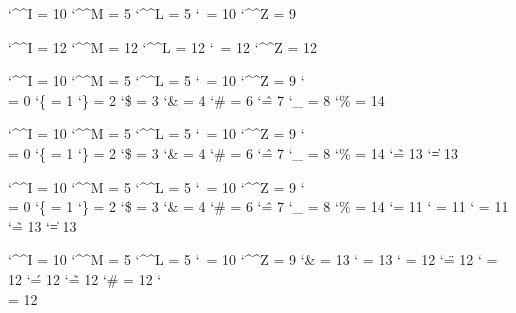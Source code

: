 
\startcatcodetable \nilcatcodes
    \catcode`\^^I = 10 %
    \catcode`\^^M =  5 %
    \catcode`\^^L =  5 %
    \catcode`\    = 10 %
    \catcode`\^^Z =  9 %
\stopcatcodetable

\startcatcodetable \vrbcatcodes %
    \catcode`\^^I = 12
    \catcode`\^^M = 12
    \catcode`\^^L = 12
    \catcode`\    = 12
    \catcode`\^^Z = 12
\stopcatcodetable

\startcatcodetable \texcatcodes
    \catcode`\^^I = 10
    \catcode`\^^M =  5
    \catcode`\^^L =  5
    \catcode`\    = 10
    \catcode`\^^Z =  9
    \catcode`\\   =  0
    \catcode`\{   =  1
    \catcode`\}   =  2
    \catcode`\$   =  3
    \catcode`\&   =  4
    \catcode`\#   =  6
    \catcode`\^   =  7
    \catcode`\_   =  8
    \catcode`\%   = 14
\stopcatcodetable

\startcatcodetable \ctxcatcodes
    \catcode`\^^I = 10
    \catcode`\^^M =  5
    \catcode`\^^L =  5
    \catcode`\    = 10
    \catcode`\^^Z =  9
    \catcode`\\   =  0
    \catcode`\{   =  1
    \catcode`\}   =  2
    \catcode`\$   =  3
    \catcode`\&   =  4
    \catcode`\#   =  6
    \catcode`\^   =  7
    \catcode`\_   =  8
    \catcode`\%   = 14
    \catcode`\~   = 13
    \catcode`\|   = 13
\stopcatcodetable

\startcatcodetable \prtcatcodes
    \catcode`\^^I = 10
    \catcode`\^^M =  5
    \catcode`\^^L =  5
    \catcode`\    = 10
    \catcode`\^^Z =  9
    \catcode`\\   =  0
    \catcode`\{   =  1
    \catcode`\}   =  2
    \catcode`\$   =  3
    \catcode`\&   =  4
    \catcode`\#   =  6
    \catcode`\^   =  7
    \catcode`\_   =  8
    \catcode`\%   = 14
    \catcode`\@   = 11
    \catcode`\!   = 11
    \catcode`\?   = 11
    \catcode`\~   = 13
    \catcode`\|   = 13
\stopcatcodetable

\startcatcodetable \xmlcatcodesn
    \catcode`\^^I = 10 %
    \catcode`\^^M =  5 %
    \catcode`\^^L =  5 %
    \catcode`\    = 10 %
    \catcode`\^^Z =  9 %
    \catcode`\&   = 13 %
    \catcode`\<   = 13 %
    \catcode`\>   = 12
    \catcode`\"   = 12 %
    \catcode`\/   = 12 %
    \catcode`\'   = 12 %
    \catcode`\~   = 12 %
    \catcode`\#   = 12 %
    \catcode`\\   = 12 %
\stopcatcodetable

